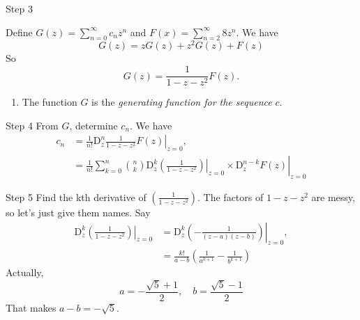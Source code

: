 \documentclass[portrait,fleqn,12pt]{beamer}
\newcommand{\D}{\mathrm{D}}
\newenvironment{handlist}
   {\begin{enumerate}[\faHandPointRight]
       \addtolength{\itemsep}{0.0\itemsep}}
     {\end{enumerate}}
\begin{document}
\begin{frame}{Step 3}

Define $G(z) =  \sum_{n=0}^\infty c_{n} z^n$ and $F(x) = \sum_{n=2}^\infty 8 z^n$. We have
\begin{equation}
  G(z) = z G(z) + z^2 G(z) + F(z)
\end{equation}
So 
\begin{equation}
  G(z) = \frac{1}{1-z-z^2} F(z).
\end{equation}

\begin{handlist}
\item The function $G$ is the \emph{generating function for the sequence} $c$.

\end{handlist}


\end{frame}
\begin{frame}{Step 4}
From $G$, determine $c_n$. We have
\begin{align*}
 c_n &= \frac{1}{n!}  \left. \D^n_z  \frac{1}{1-z-z^2} F(z) \right  \vert_{z=0}, \\
       &= \frac{1}{n!}  \left. \left. \sum_{k=0}^n \binom{n}{k} \D^k_z \left( \frac{1}{1-z-z^2} \right)  \right \vert_{z=0} \times \D^{n-k} _z F(z )  \right \vert_{z=0} 
\end{align*}

\end{frame}

\begin{frame}{Step 5}
Find the kth derivative of $\left( \frac{1}{1-z-z^2} \right) $.   The factors of $1-z-z^2$ are messy, so let's just give them names. Say
\begin{align*}
   \left. \D^k_z \left( \frac{1}{1-z-z^2} \right) \right \vert_{z=0} &=  \left. \D^k_z \left( -\frac{1}{(z-a)(z-b)} \right)  \right \vert_{z=0}, \\
                                                                       &=   \frac{k!}{a-b} \left(\frac{1}{a^{k+1}} - \frac{1}{b^{k+1}} \right)
\end{align*}
Actually,
\[
   a =  -\frac{\sqrt{5}+1}{2}, \quad b = \frac{\sqrt{5}-1}{2}
\]
That makes $a-b = -\sqrt{5}$. 
\end{frame}
\end{document}

